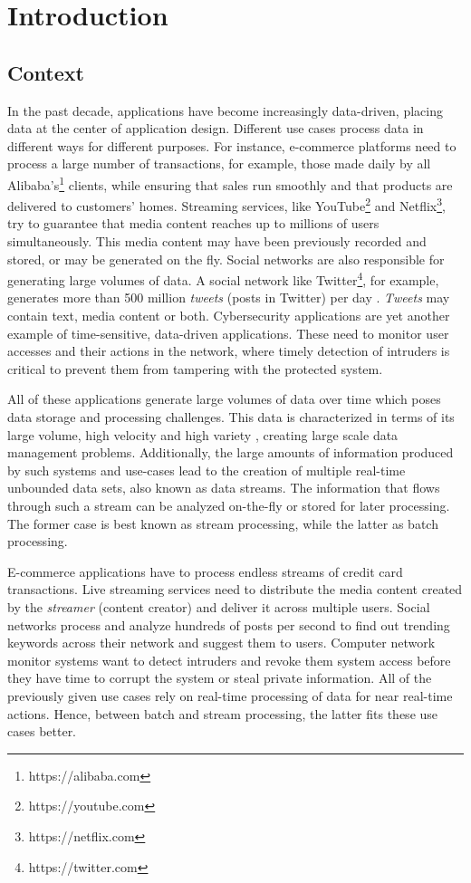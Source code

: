 \chapter{Introduction} \label{chap:intro} \minitoc

\section{Context} \label{sec:context}
In the past decade, applications have become increasingly data-driven, placing data at the center of application design. Different use cases process data in different ways for different purposes. For instance, e-commerce platforms need to process a large number of transactions, for example, those made daily by all Alibaba's\footnote{https://alibaba.com} clients, while ensuring that sales run smoothly and that products are delivered to customers' homes. Streaming services, like YouTube\footnote{https://youtube.com} and Netflix\footnote{https://netflix.com}, try to guarantee that media content reaches up to millions of users simultaneously. This media content may have been previously recorded and stored, or may be generated on the fly. Social networks are also responsible for generating large volumes of data. A social network like Twitter\footnote{https://twitter.com}, for example, generates more than 500 million \textit{tweets} (posts in Twitter) per day \cite{twitter-throughput}. \textit{Tweets} may contain text, media content or both. Cybersecurity applications are yet another example of time-sensitive, data-driven applications. These need to monitor user accesses and their actions in the network, where timely detection of intruders is critical to prevent them from tampering with the protected system.

All of these applications generate large volumes of data over time which poses data storage and processing challenges. This data is characterized in terms of its large volume, high velocity and high variety \cite{Mavragani-GoogleTrends-SLR}, creating large scale data management problems. Additionally, the large amounts of information produced by such systems and use-cases lead to the creation of multiple real-time unbounded data sets, also known as data streams. The information that flows through such a stream can be analyzed on-the-fly or stored for later processing. The former case is best known as stream processing, while the latter as batch processing. 

E-commerce applications have to process endless streams of credit card transactions. Live streaming services need to distribute the media content created by the \textit{streamer} (content creator) and deliver it across multiple users. Social networks process and analyze hundreds of posts per second to find out trending keywords across their network and suggest them to users. Computer network monitor systems want to detect intruders and revoke them system access before they have time to corrupt the system or steal private information. All of the previously given use cases rely on real-time processing of data for near real-time actions. Hence, between batch and stream processing, the latter fits these use cases better.

